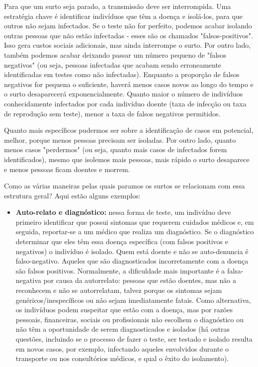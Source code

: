 \documentclass[onecolumn,journal]{IEEEtran}
\begin{document}
\begin{multicols}{2}

Para que um surto seja parado, a transmissão deve ser interrompida. Uma estratégia chave é identificar indivíduos que têm a doença e isolá-los, para que outros não sejam infectados. Se o teste não for perfeito, podemos acabar isolando outras pessoas que não estão infectadas - esses são os chamados "falsos-positivos". Isso gera custos sociais adicionais, mas ainda interrompe o surto. Por outro lado, também podemos acabar deixando passar um número pequeno de "falsos negativos" (ou seja, pessoas infectadas que acabam sendo erroneamente identificadas em testes como não infectadas). Enquanto a proporção de falsos negativos for pequena o suficiente, haverá menos casos novos ao longo do tempo e o surto desaparecerá exponencialmente. Quanto maior o número de indivíduos conhecidamente infectados por cada indivíduo doente (taxa de infecção ou taxa de reprodução sem teste), menor a taxa de falsos negativos permitidos.

Quanto mais específicos pudermos ser sobre a identificação de casos em potencial, melhor, porque menos pessoas precisam ser isoladas. Por outro lado, quanto menos casos "perdermos" (ou seja, quanto mais casos de infectados forem identificados), mesmo que isolemos mais pessoas, mais rápido o surto desaparece e menos pessoas ficam doentes e morrem.

Como as várias maneiras pelas quais paramos os surtos se relacionam com essa estrutura geral? Aqui estão alguns exemplos:

\begin{itemize}
    \item \textbf{Auto-relato e diagnóstico:} nessa forma de teste, um indivíduo deve primeiro identificar que possui sintomas que requerem cuidados médicos e, em seguida, reportar-se a um médico que realiza um diagnóstico. Se o diagnóstico determinar que eles têm essa doença específica (com falsos positivos e negativos) o indivíduo é isolado. Quem está doente e não se auto-denuncia é falso-negativo. Aqueles que são diagnosticados incorretamente com a doença são falsos positivos. Normalmente, a dificuldade mais importante é a falsa-negativa por causa da autorrelato: pessoas que estão doentes, mas não a reconhecem e não se autorrelatam, talvez porque os sintomas sejam genéricos/inespecíficos ou não sejam imediatamente fatais. Como alternativa, os indivíduos podem suspeitar que estão com a doença, mas por razões pessoais, financeiras, sociais ou profissionais não escolhem o diagnóstico ou não têm a oportunidade de serem diagnosticados e isolados (há outras questões, incluindo se o processo de fazer o teste, ser testado e isolado resulta em novos casos, por exemplo, infectando aqueles envolvidos durante o transporte ou nos consultórios médicos, e qual o êxito do isolamento).
    

\end{itemize}
\end{multicols}
\end{document}
